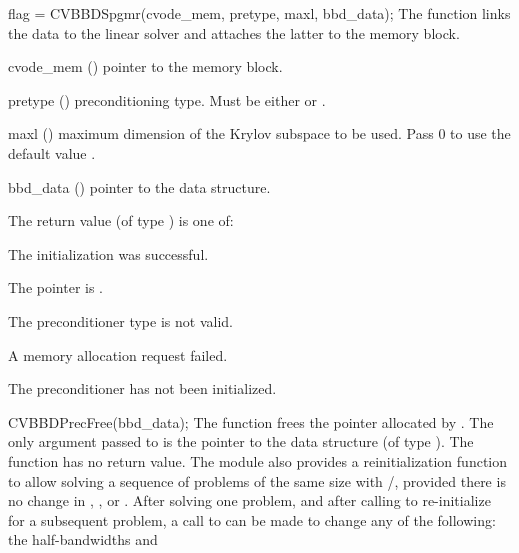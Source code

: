 {
  flag = CVBBDSpgmr(cvode\_mem, pretype, maxl, bbd\_data);
}
{
  The function  links the {\cvbbdpre} data to the
  {\cvspgmr} linear solver and attaches the latter to the {\cvodes}
  memory block.
}
{
  \begin{args}
  \item[cvode\_mem] ()
    pointer to the {\cvodes} memory block.
  \item[pretype] ()
    preconditioning type. Must be either  or .
  \item[maxl] ()
    maximum dimension of the Krylov subspace to be used. Pass $0$ to use the 
    default value .
  \item[bbd\_data] ()
    pointer to the {\cvbbdpre} data structure.
  \end{args}
}
{
  The return value  (of type ) is one of:
  \begin{args}
  \item[\Id{CVSPGMR\_SUCCESS}] 
    The {\cvspgmr} initialization was successful.
  \item[\Id{CVSPGMR\_MEM\_NULL}]
    The  pointer is .
  \item[\Id{CVSPGMR\_ILL\_INPUT}]
    The preconditioner type  is not valid.
  \item[\Id{CVSPGMR\_MEM\_FAIL}]
    A memory allocation request failed.
  \item[\Id{CV\_PDATA\_NULL}]
    The {\cvbbdpre} preconditioner has not been initialized.
  \end{args}
}
{}
{
  CVBBDPrecFree(bbd\_data);
}
{
  The function  frees the pointer allocated by
  .
}
{
  The only argument passed to  is the pointer to the {\cvbbdpre} 
  data structure (of type ).
}
{
  The function  has no return value.
}
{}
The {\cvbbdpre} module also provides a reinitialization function to allow
solving  a sequence of problems of the same size with {\cvspgmr}/{\cvbbdpre},
provided there is no change in , , or .
After solving one problem, and after calling  to re-initialize 
{\cvodes} for a subsequent problem, a call to  can be made
to change any of the following: the half-bandwidths  and  
